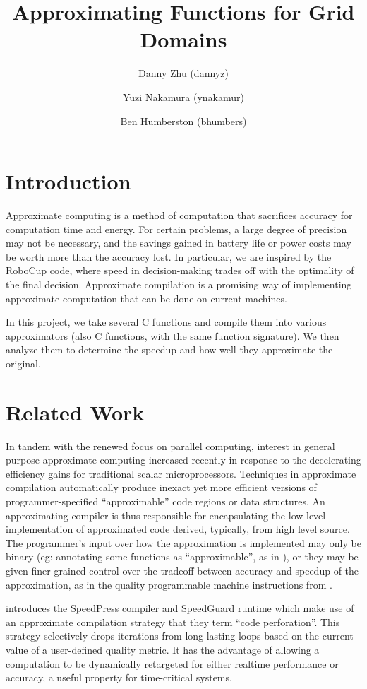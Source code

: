 \documentclass{article}
\begin{document}
\title{Approximating Functions for Grid Domains}
\author{Danny Zhu (dannyz) \and Yuzi Nakamura (ynakamur) \and Ben Humberston (bhumbers)}

\maketitle

\section{Introduction}

Approximate computing is a method of computation that sacrifices accuracy for computation time and energy. For certain problems, a large degree of precision may not be necessary, and the savings gained in battery life or power costs may be worth more than the accuracy lost. In particular, we are inspired by the RoboCup code, where speed in decision-making trades off with the optimality of the final decision. Approximate compilation is a promising way of implementing approximate computation that can be done on current machines.

In this project, we take several C functions and compile them into various approximators (also C functions, with the same function signature). We then analyze them to determine the speedup and how well they approximate the original.

\section{Related Work}
In tandem with the renewed focus on parallel computing, interest in general purpose approximate computing increased recently in response to the decelerating efficiency gains for traditional scalar microprocessors. Techniques in approximate compilation automatically produce inexact yet more efficient versions of programmer-specified ``approximable'' code regions or data structures. An approximating compiler is thus responsible for encapsulating the low-level implementation of approximated code derived, typically, from high level source. The programmer's input over how the approximation is implemented may only be binary (eg: annotating some functions as ``approximable'', as in \cite{Esmaeilzadeh12}), or they may be given finer-grained control over the tradeoff between accuracy and speedup of the approximation, as in the quality programmable machine instructions from \cite{Venkataramani13}.

\cite{Agarwal09} introduces the SpeedPress compiler and SpeedGuard runtime which make use of an approximate compilation strategy that they term ``code perforation''. This strategy selectively drops iterations from long-lasting loops based on the current value of a user-defined quality metric. It has the advantage of allowing a computation to be dynamically retargeted for either realtime performance or accuracy, a useful property for time-critical systems.
\end{document}
